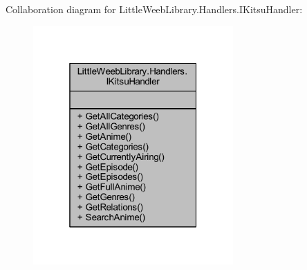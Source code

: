 Collaboration diagram for Little\+Weeb\+Library.\+Handlers.\+I\+Kitsu\+Handler\+:\nopagebreak
\begin{figure}[H]
\begin{center}
\leavevmode
\includegraphics[width=217pt]{interface_little_weeb_library_1_1_handlers_1_1_i_kitsu_handler__coll__graph}
\end{center}
\end{figure}
